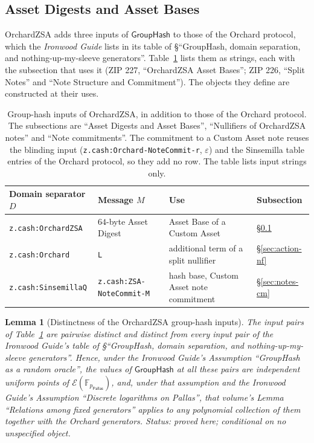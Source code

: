 \documentclass[11pt,a4paper]{article}
\newtheorem{lemma}[theorem]{Lemma}
\theoremstyle{definition}
\newcommand{\F}{\mathbb{F}}
\newcommand{\Pallas}{\ensuremath{\mathsf{Pallas}}}
\newcommand{\Ep}{\ensuremath{\mathcal{E}}}
\newcommand{\GroupHash}{\ensuremath{\mathsf{GroupHash}}}
\begin{document}
\FloatBarrier
\subsection{Asset Digests and Asset Bases}\label{sec:asset-base}

OrchardZSA adds three inputs of $\GroupHash$ to those of the Orchard
protocol, which the \emph{Ironwood Guide} lists in its table of
\S``GroupHash, domain separation, and nothing-up-my-sleeve generators''.
Table~\ref{tab:grouphash-zsa} lists them as strings, each with the
subsection that uses it (ZIP 227, ``OrchardZSA Asset Bases''; ZIP 226,
``Split Notes'' and ``Note Structure and Commitment''). The objects they
define are constructed at their uses.

\begin{table}[ht]
\centering\footnotesize\setlength{\tabcolsep}{4pt}
\begin{tabular}{@{}llll@{}}
\toprule
Domain separator $D$ & Message $M$ & Use & Subsection \\
\midrule
\texttt{z.cash:OrchardZSA} & $64$-byte Asset Digest
  & Asset Base of a Custom Asset & \S\ref{sec:asset-base} \\
\texttt{z.cash:Orchard} & \texttt{L}
  & additional term of a split nullifier & \S\ref{sec:action-nf} \\
\texttt{z.cash:SinsemillaQ} & \texttt{z.cash:ZSA-NoteCommit-M}
  & hash base, Custom Asset note commitment & \S\ref{sec:notes-cm} \\
\bottomrule
\end{tabular}
\caption{Group-hash inputs of OrchardZSA, in addition to those of the
Orchard protocol. The subsections are ``Asset Digests and Asset Bases'',
``Nullifiers of OrchardZSA notes'' and ``Note commitments''. The commitment
to a Custom Asset note reuses the blinding input
(\texttt{z.cash:Orchard-NoteCommit-r}, $\varepsilon$) and the Sinsemilla
table entries of the Orchard protocol, so they add no row. The table lists
input strings only.}
\label{tab:grouphash-zsa}
\end{table}

\begin{lemma}[Distinctness of the OrchardZSA group-hash inputs]
\label{lem:grouphash-distinct}
The input pairs of Table~\ref{tab:grouphash-zsa} are pairwise distinct and
distinct from every input pair of the \emph{Ironwood Guide}'s table of
\S``GroupHash, domain separation, and nothing-up-my-sleeve generators''.
Hence, under the \emph{Ironwood Guide}'s Assumption ``GroupHash as a random
oracle'', the values of $\GroupHash$ at all these pairs are independent
uniform points of $\Ep(\F_{p_{\Pallas}})$, and, under that assumption and
the \emph{Ironwood Guide}'s Assumption ``Discrete logarithms on Pallas'',
that volume's Lemma ``Relations among fixed generators'' applies to any
polynomial collection of them together with the Orchard generators.
Status: proved here; conditional on no unspecified object.
\end{lemma}
\end{document}
